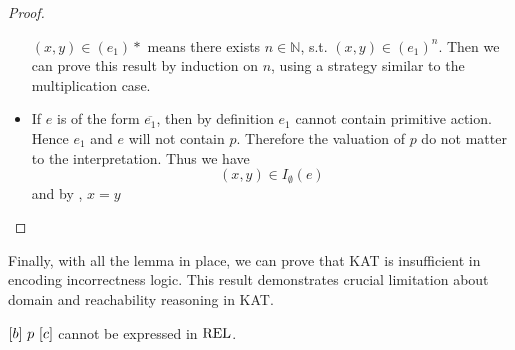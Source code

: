 \begin{proof}
\begin{itemize}
        \((x, y) ∈ (e_1)*\) means there exists \(n ∈ ℕ\),
        s.t. \((x, y) ∈ {(e_1)}^{n}\).
        Then we can prove this result by induction on \(n\), 
        using a strategy similar to the multiplication case.
        \item If \(e\) is of the form \(\overline{e_1}\),
        then by definition \(e_1\) cannot contain primitive action.
        Hence \(e_1\) and \(e\) will not contain \(p\).
        Therefore the valuation of \(p\) do not matter to the interpretation.
        Thus we have \[(x, y) ∈ I_∅(e)\]
        and by , \(x = y\) \qedhere
    \end{itemize}
\end{proof}

Finally, with all the lemma in place, we can prove that KAT is insufficient in encoding incorrectness logic. 
This result demonstrates crucial limitation about domain and reachability reasoning in KAT.

\begin{theorem}\label{the: KAT not able to express incorrectness logic}
    \([b]~p~[c]\)
    cannot be expressed in \(\mathbf{\mathrm{REL}}\).
\end{theorem}

